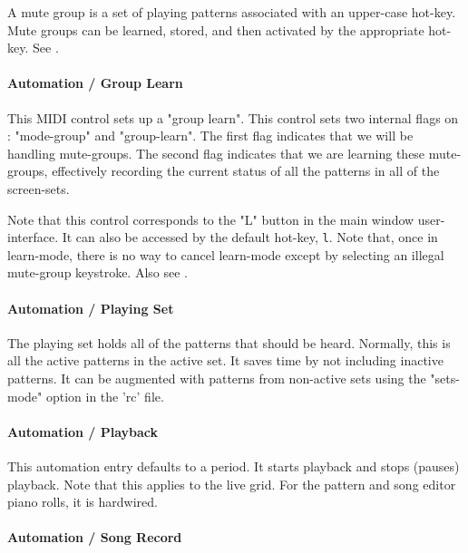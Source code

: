    A mute group is a set of playing patterns associated with an upper-case
   hot-key. Mute groups can be learned, stored, and then activated by
   the appropriate hot-key.
   See .

\paragraph{Automation / Group Learn}
\label{paragraph:configuration_midi_ctrl_modglean}

   This MIDI control sets up a "group learn".
   This control sets two internal flags on : "mode-group" and "group-learn".
   The first flag indicates that we will be handling mute-groups.
   The second flag indicates that we are learning these mute-groups,
   effectively recording the current status of all the patterns in all of the
   screen-sets.

   Note that this control corresponds to the "L" button in the main window
   user-interface.
   It can also be accessed by the default hot-key, \texttt{l}.
   Note that, once in learn-mode, there is no way to cancel learn-mode
   except by selecting an illegal mute-group keystroke.
   Also see .

\paragraph{Automation / Playing Set}
\label{paragraph:configuration_playing_set}

   The playing set holds all of the patterns that should be heard.
   Normally, this is all the active patterns in the active set.
   It saves time by not including inactive patterns.
   It can be augmented with patterns from non-active sets using
   the "sets-mode" option in the 'rc' file.

\paragraph{Automation / Playback}
\label{paragraph:configuration_playback}

   This automation entry defaults to a period.
   It starts playback and stops (pauses) playback.
   Note that this applies to the live grid.
   For the pattern and song editor piano rolls, it is hardwired.

\paragraph{Automation / Song Record}
\label{paragraph:configuration_song_record}

